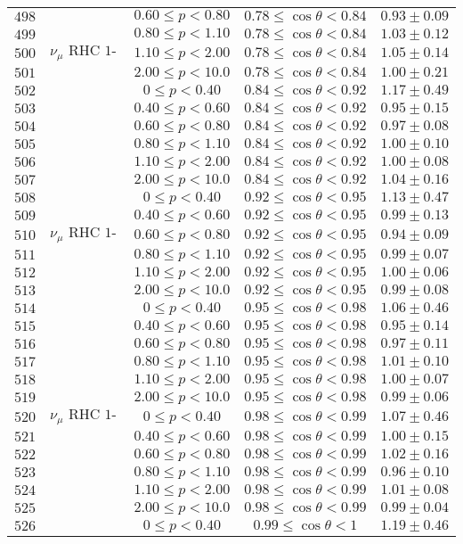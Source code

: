 \begin{longtable}[c]{ccccc}
$498$ &  & $0.60\leq p<0.80$ & $0.78\leq\cos\theta<0.84$ & $0.93\pm0.09$\tabularnewline
$499$ &  & $0.80\leq p<1.10$ & $0.78\leq\cos\theta<0.84$ & $1.03\pm0.12$\tabularnewline
$500$ & $\nu_{\mu}\text{ RHC 1-Trk Air}$ & $1.10\leq p<2.00$ & $0.78\leq\cos\theta<0.84$ & $1.05\pm0.14$\tabularnewline
$501$ &  & $2.00\leq p<10.0$ & $0.78\leq\cos\theta<0.84$ & $1.00\pm0.21$\tabularnewline
$502$ &  & $0\leq p<0.40$ & $0.84\leq\cos\theta<0.92$ & $1.17\pm0.49$\tabularnewline
$503$ &  & $0.40\leq p<0.60$ & $0.84\leq\cos\theta<0.92$ & $0.95\pm0.15$\tabularnewline
$504$ &  & $0.60\leq p<0.80$ & $0.84\leq\cos\theta<0.92$ & $0.97\pm0.08$\tabularnewline
$505$ &  & $0.80\leq p<1.10$ & $0.84\leq\cos\theta<0.92$ & $1.00\pm0.10$\tabularnewline
$506$ &  & $1.10\leq p<2.00$ & $0.84\leq\cos\theta<0.92$ & $1.00\pm0.08$\tabularnewline
$507$ &  & $2.00\leq p<10.0$ & $0.84\leq\cos\theta<0.92$ & $1.04\pm0.16$\tabularnewline
$508$ &  & $0\leq p<0.40$ & $0.92\leq\cos\theta<0.95$ & $1.13\pm0.47$\tabularnewline
$509$ &  & $0.40\leq p<0.60$ & $0.92\leq\cos\theta<0.95$ & $0.99\pm0.13$\tabularnewline
$510$ & $\nu_{\mu}\text{ RHC 1-Trk Air}$ & $0.60\leq p<0.80$ & $0.92\leq\cos\theta<0.95$ & $0.94\pm0.09$\tabularnewline
$511$ &  & $0.80\leq p<1.10$ & $0.92\leq\cos\theta<0.95$ & $0.99\pm0.07$\tabularnewline
$512$ &  & $1.10\leq p<2.00$ & $0.92\leq\cos\theta<0.95$ & $1.00\pm0.06$\tabularnewline
$513$ &  & $2.00\leq p<10.0$ & $0.92\leq\cos\theta<0.95$ & $0.99\pm0.08$\tabularnewline
$514$ &  & $0\leq p<0.40$ & $0.95\leq\cos\theta<0.98$ & $1.06\pm0.46$\tabularnewline
$515$ &  & $0.40\leq p<0.60$ & $0.95\leq\cos\theta<0.98$ & $0.95\pm0.14$\tabularnewline
$516$ &  & $0.60\leq p<0.80$ & $0.95\leq\cos\theta<0.98$ & $0.97\pm0.11$\tabularnewline
$517$ &  & $0.80\leq p<1.10$ & $0.95\leq\cos\theta<0.98$ & $1.01\pm0.10$\tabularnewline
$518$ &  & $1.10\leq p<2.00$ & $0.95\leq\cos\theta<0.98$ & $1.00\pm0.07$\tabularnewline
$519$ &  & $2.00\leq p<10.0$ & $0.95\leq\cos\theta<0.98$ & $0.99\pm0.06$\tabularnewline
$520$ & $\nu_{\mu}\text{ RHC 1-Trk Air}$ & $0\leq p<0.40$ & $0.98\leq\cos\theta<0.99$ & $1.07\pm0.46$\tabularnewline
$521$ &  & $0.40\leq p<0.60$ & $0.98\leq\cos\theta<0.99$ & $1.00\pm0.15$\tabularnewline
$522$ &  & $0.60\leq p<0.80$ & $0.98\leq\cos\theta<0.99$ & $1.02\pm0.16$\tabularnewline
$523$ &  & $0.80\leq p<1.10$ & $0.98\leq\cos\theta<0.99$ & $0.96\pm0.10$\tabularnewline
$524$ &  & $1.10\leq p<2.00$ & $0.98\leq\cos\theta<0.99$ & $1.01\pm0.08$\tabularnewline
$525$ &  & $2.00\leq p<10.0$ & $0.98\leq\cos\theta<0.99$ & $0.99\pm0.04$\tabularnewline
$526$ &  & $0\leq p<0.40$ & $0.99\leq\cos\theta<1$ & $1.19\pm0.46$\tabularnewline

\end{longtable}
